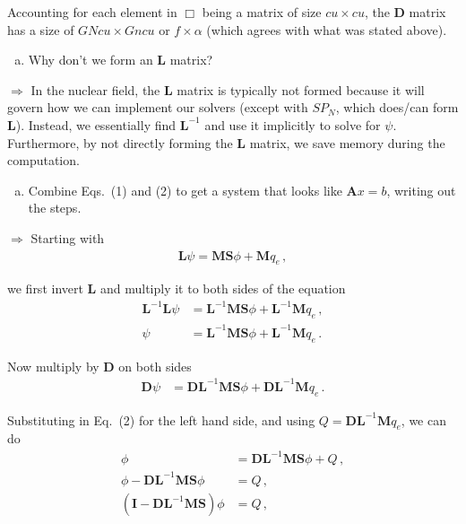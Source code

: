 \documentclass[10pt]{article}
\begin{document}
Accounting for each element in $\Box$ being a matrix of size $cu \times cu$, the $\textbf{D}$ matrix has a size of $GNcu \times Gncu$ or $f \times \alpha$ (which agrees with what was stated above).

%
%
%

\newpage
\begin{enumerate}[(d)]
\item Why don't we form an $\textbf{L}$ matrix?
\end{enumerate}

$\Rightarrow$ In the nuclear field, the $\textbf{L}$ matrix is typically not formed because it will govern how we can implement our solvers (except with $SP_N$, which does/can form $\textbf{L}$). Instead, we essentially find $\textbf{L}^{-1}$ and use it implicitly to solve for $\psi$. Furthermore, by not directly forming the $\textbf{L}$ matrix, we save memory during the computation. 

%
%
%

\vspace{10pt}
\begin{enumerate}[(e)]
\item Combine Eqs.~(1) and (2) to get a system that looks like $\textbf{A}x = b$, writing out the steps.
\end{enumerate}

$\Rightarrow$ Starting with
%
\begin{align*}
    \textbf{L} \psi = \textbf{MS} \phi + \textbf{M} q_e\,,
\end{align*}

we first invert \textbf{L} and multiply it to both sides of the equation
%
\begin{align*}
    \textbf{L} ^{-1}\textbf{L} \psi &= \textbf{L} ^{-1}\textbf{MS} \phi + \textbf{L} ^{-1}\textbf{M} q_e\,, \\
     \psi &= \textbf{L} ^{-1}\textbf{MS} \phi + \textbf{L} ^{-1}\textbf{M} q_e\,.
\end{align*} 

Now multiply by \textbf{D} on both sides
%
\begin{align*}
    \textbf{D}\psi &= \textbf{D}\textbf{L} ^{-1}\textbf{MS} \phi + \textbf{D}\textbf{L} ^{-1}\textbf{M} q_e\,.
\end{align*} 

Substituting in Eq.~(2) for the left hand side, and using $Q=\textbf{D}\textbf{L} ^{-1}\textbf{M} q_e$, we can do
%
\begin{align*}
    \phi &= \textbf{D}\textbf{L} ^{-1}\textbf{MS} \phi + Q\,,\\
    \phi - \textbf{D}\textbf{L} ^{-1}\textbf{MS} \phi &= Q\,,\\
    (\textbf{I} - \textbf{D}\textbf{L} ^{-1}\textbf{MS})\phi &= Q\,,
\end{align*} 
\end{document}
